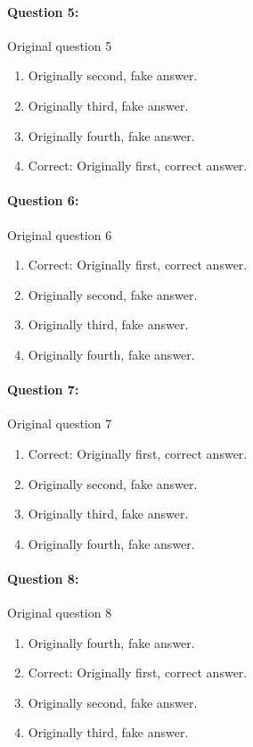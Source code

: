\documentclass[9pt, twoside, twocolumn]{extarticle}
\begin{document}
\paragraph{Question 5:}
Original question 5

\begin{enumerate}[label=\textbf{{\Alph*}},labelindent=0pt, labelsep=1.5em, parsep=0.2em]
\item Originally second, fake answer.
\item Originally third, fake answer.
\item Originally fourth, fake answer.
\item Correct: Originally first, correct answer.
\end{enumerate}
\paragraph{Question 6:}
Original question 6

\begin{enumerate}[label=\textbf{{\Alph*}},labelindent=0pt, labelsep=1.5em, parsep=0.2em]
\item Correct: Originally first, correct answer.
\item Originally second, fake answer.
\item Originally third, fake answer.
\item Originally fourth, fake answer.
\end{enumerate}
\paragraph{Question 7:}
Original question 7

\begin{enumerate}[label=\textbf{{\Alph*}},labelindent=0pt, labelsep=1.5em, parsep=0.2em]
\item Correct: Originally first, correct answer.
\item Originally second, fake answer.
\item Originally third, fake answer.
\item Originally fourth, fake answer.
\end{enumerate}
\paragraph{Question 8:}
Original question 8

\begin{enumerate}[label=\textbf{{\Alph*}},labelindent=0pt, labelsep=1.5em, parsep=0.2em]
\item Originally fourth, fake answer.
\item Correct: Originally first, correct answer.
\item Originally second, fake answer.
\item Originally third, fake answer.
\end{enumerate}
\end{document}
